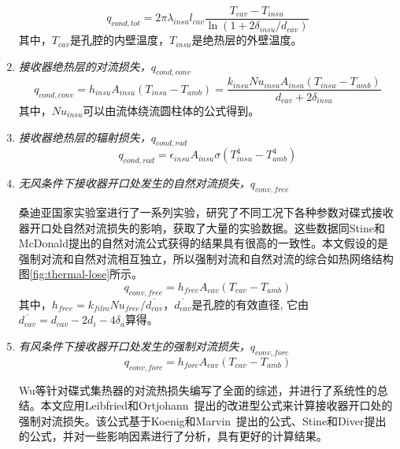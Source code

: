 \begin{enumerate}[label=(\arabic*)]
  \begin{equation}
q_{cond,tot}=2\pi\lambda_{insu}l_{cav}\dfrac{T_{cav}-T_{insu}}{\ln(1 + 2\delta_{insu}/d_{cav})}
    \end{equation}  
    其中，$T_{cav}$是孔腔的内壁温度，$T_{insu}$是绝热层的外壁温度。

  \item \emph{接收器绝热层的对流损失，$q_{cond,conv}$}  
  \begin{equation}
	q_{cond,conv}=h_{insu}A_{insu}(T_{insu}-T_{amb})
	=\dfrac{k_{insu}Nu_{insu}A_{insu}(T_{insu}-T_{amb})}{d_{cav}+2\delta_{insu}}
\end{equation}
其中，$Nu_{insu}$可以由流体绕流圆柱体的公式得到。~\cite{Churchill1977}

  \item \emph{接收器绝热层的辐射损失，$q_{cond,rad}$}  
  \begin{equation}
	q_{cond,rad}=\epsilon_{insu}A_{insu}\sigma(T_{insu}^4 - T_{amb}^4)
\end{equation}
  \item \emph{无风条件下接收器开口处发生的自然对流损失，$q_{conv,free}$}
    
  桑迪亚国家实验室进行了一系列实验，研究了不同工况下各种参数对碟式接收器开口处自然对流损失的影响，获取了大量的实验数据\cite{Ma1993}。这些数据同Stine和McDonald提出的自然对流公式获得的结果具有很高的一致性。本文假设的是强制对流和自然对流相互独立，所以强制对流和自然对流的综合如热网络结构图\ref{fig:thermal-lose}所示。
  \begin{equation}
	q_{conv,free} = h_{free}A_{cav}(T_{cav}-T_{amb})
\end{equation}
其中，$h_{free}=k_{film}Nu_{free}/\overline{d_{cav}}$，$\overline{d_{cav}}$是孔腔的有效直径, 它由$\overline{d_{cav}}=d_{cav}-2d_i-4 \delta_a$算得。
  
  \item \emph{有风条件下接收器开口处发生的强制对流损失，$q_{conv,forc}$}  
  \begin{equation}
	q_{conv,forc} = h_{forc}A_{cav}(T_{cav}-T_{amb})
\end{equation}

    Wu等\cite{Wu2010}针对碟式集热器的对流热损失编写了全面的综述，并进行了系统性的总结。本文应用Leibfried和Ortjohann~\cite{Leibfried1995}提出的改进型公式来计算接收器开口处的强制对流损失。该公式基于Koenig和Marvin~\cite{Koenig1981}提出的公式、Stine和Diver\cite{Stine1994}提出的公式，并对一些影响因素进行了分析，具有更好的计算结果。


\end{enumerate}
